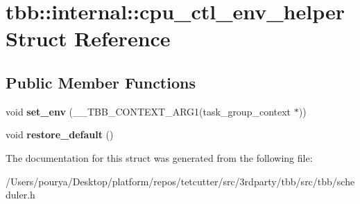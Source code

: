 \hypertarget{structtbb_1_1internal_1_1cpu__ctl__env__helper}{}\section{tbb\+:\+:internal\+:\+:cpu\+\_\+ctl\+\_\+env\+\_\+helper Struct Reference}
\label{structtbb_1_1internal_1_1cpu__ctl__env__helper}
\subsection*{Public Member Functions}
\begin{DoxyCompactItemize}
\item 
\hypertarget{structtbb_1_1internal_1_1cpu__ctl__env__helper_a9a28b923fc02dbcc3b67847939f0cc78}{}void {\bfseries set\+\_\+env} (\+\_\+\+\_\+\+T\+B\+B\+\_\+\+C\+O\+N\+T\+E\+X\+T\+\_\+\+A\+R\+G1(task\+\_\+group\+\_\+context $\ast$))\label{structtbb_1_1internal_1_1cpu__ctl__env__helper_a9a28b923fc02dbcc3b67847939f0cc78}

\item 
\hypertarget{structtbb_1_1internal_1_1cpu__ctl__env__helper_ae41b8a95d3d06f6ebd808dd684a18839}{}void {\bfseries restore\+\_\+default} ()\label{structtbb_1_1internal_1_1cpu__ctl__env__helper_ae41b8a95d3d06f6ebd808dd684a18839}

\end{DoxyCompactItemize}


The documentation for this struct was generated from the following file\+:\begin{DoxyCompactItemize}
\item 
/\+Users/pourya/\+Desktop/platform/repos/tetcutter/src/3rdparty/tbb/src/tbb/scheduler.\+h\end{DoxyCompactItemize}
